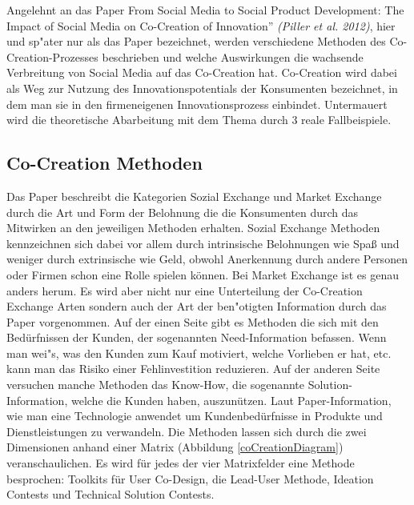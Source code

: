 Angelehnt an das  Paper \glqq From Social Media to Social Product Development: The Impact of Social Media on Co-Creation of Innovation'' \textit{(Piller et al. 2012)}\cite{mainreference}, hier und sp"ater nur als das Paper bezeichnet, werden verschiedene Methoden des Co-Creation-Prozesses beschrieben und welche Auswirkungen die wachsende Verbreitung von Social Media auf das Co-Creation hat. Co-Creation wird dabei als Weg zur Nutzung des Innovationspotentials der Konsumenten bezeichnet, in dem man sie in den firmeneigenen Innovationsprozess einbindet. Untermauert wird die theoretische Abarbeitung mit dem Thema durch 3 reale Fallbeispiele.

\subsection{Co-Creation Methoden}
Das Paper beschreibt die Kategorien Sozial Exchange und Market Exchange durch die Art und Form der Belohnung die die Konsumenten durch das Mitwirken an den jeweiligen Methoden erhalten. Sozial Exchange Methoden kennzeichnen sich dabei vor allem durch intrinsische Belohnungen wie Spa\ss{} und weniger durch extrinsische wie Geld, obwohl Anerkennung durch andere Personen oder Firmen schon eine Rolle spielen k\"onnen. Bei Market Exchange ist es genau anders herum. Es wird aber nicht nur eine Unterteilung der Co-Creation Exchange Arten sondern auch der Art der ben"otigten Information durch das Paper vorgenommen.
Auf der einen Seite gibt es Methoden die sich mit den Bed\"urfnissen der Kunden, der sogenannten Need-Information befassen. Wenn man wei"s, was den Kunden zum Kauf motiviert, welche Vorlieben er hat, etc. kann man das Risiko einer Fehlinvestition reduzieren. Auf der anderen Seite versuchen manche Methoden das Know-How, die sogenannte Solution-Information, welche die Kunden haben, auszun\"utzen.
Laut Paper-Information, wie man eine Technologie anwendet um Kundenbed\"urfnisse in Produkte und Dienstleistungen zu verwandeln. 
 Die Methoden lassen sich durch die zwei Dimensionen anhand einer Matrix (Abbildung \ref{coCreationDiagram}) veranschaulichen. Es wird f\"ur jedes der vier Matrixfelder eine Methode besprochen: Toolkits f\"ur User Co-Design, die Lead-User Methode, Ideation Contests und Technical Solution Contests.
\pagebreak
